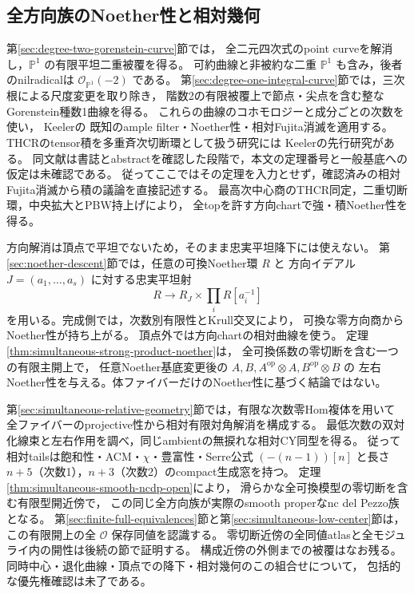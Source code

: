 \documentclass[a4paper,11pt]{ltjsarticle}
\numberwithin{equation}{section}
\theoremstyle{plain}
\theoremstyle{definition}
\theoremstyle{remark}
\begin{document}
\subsection{全方向族のNoether性と相対幾何}
第\ref{sec:degree-two-gorenstein-curve}節では，
全二元四次式のpoint curveを解消し，$\mathbb P^1$ の有限平坦二重被覆を得る。
可約曲線と非被約な二重 $\mathbb P^1$ も含み，後者のnilradicalは
$\mathcal O_{\mathbb P^1}(-2)$ である。
第\ref{sec:degree-one-integral-curve}節では，三次根による尺度変更を取り除き，
階数2の有限被覆上で節点・尖点を含む整なGorenstein種数1曲線を得る。
これらの曲線のコホモロジーと成分ごとの次数を使い，
Keeler\cite[Theorems~1.3, 7.14; Erratum~Theorem~E2.5]{Keeler2003}の
既知のample filter・Noether性・相対Fujita消滅を適用する。
THCRのtensor積を多重斉次切断環として扱う研究には
Keeler\cite{KeelerMultiple2003}の先行研究がある。
同文献は書誌とabstractを確認した段階で，本文の定理番号と一般基底への仮定は未確認である。
従ってここではその定理を入力とせず，確認済みの相対Fujita消滅から積の議論を直接記述する。
最高次中心商のTHCR同定，二重切断環，中央拡大とPBW持上げにより，
全topを許す方向chartで強・積Noether性を得る。

方向解消は頂点で平坦でないため，そのまま忠実平坦降下には使えない。
第\ref{sec:noether-descent}節では，任意の可換Noether環 $R$ と
方向イデアル $J=(a_1,\ldots,a_s)$ に対する忠実平坦射
\[
 R\longrightarrow\widehat R_J\times\prod_iR[a_i^{-1}]
\]
を用いる。完成側では，次数別有限性とKrull交叉により，
可換な零方向商からNoether性が持ち上がる。
頂点外では方向chartの相対曲線を使う。
定理\ref{thm:simultaneous-strong-product-noether}は，
全可換係数の零切断を含む一つの有限主開上で，
任意Noether基底変更後の $A,B,A^{\mathrm{op}}\otimes A,B^{\mathrm{op}}\otimes B$ の
左右Noether性を与える。体ファイバーだけのNoether性に基づく結論ではない。

第\ref{sec:simultaneous-relative-geometry}節では，有限な次数零Hom複体を用いて
全ファイバーのprojective性から相対有限対角解消を構成する。
最低次数の双対化線束と左右作用を調べ，同じambientの無捩れな相対CY同型を得る。
従って相対tailsは飽和性・ACM・$\chi$・豊富性・Serre公式
$(-(n-1))[n]$ と長さ $n+5$（次数1），$n+3$（次数2）のcompact生成窓を持つ。
定理\ref{thm:simultaneous-smooth-ncdp-open}により，
滑らかな全可換模型の零切断を含む有限型開近傍で，
この同じ全方向族が実際のsmooth properなnc del Pezzo族となる。
第\ref{sec:finite-full-equivalences}節と第\ref{sec:simultaneous-low-center}節は，
この有限開上の全 $\mathcal O$ 保存同値を認識する。
零切断近傍の全同値atlasと全モジュライ内の開性は後続の節で証明する。
構成近傍の外側までの被覆はなお残る。
同時中心・退化曲線・頂点での降下・相対幾何のこの組合せについて，
包括的な優先権確認は未了である。
\end{document}
